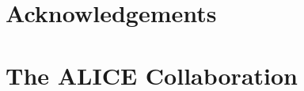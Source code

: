 \documentclass[ALICE,manyauthors]{cernphprep}
\begin{document}
\newenvironment{acknowledgement}{\relax}{\relax}
\begin{acknowledgement}
\section*{Acknowledgements}
\end{acknowledgement}
%
%
%
%

% 
%
%



\newpage
%
%
\appendix
\section{The ALICE Collaboration}
\label{app:collab}
%
\end{document}
